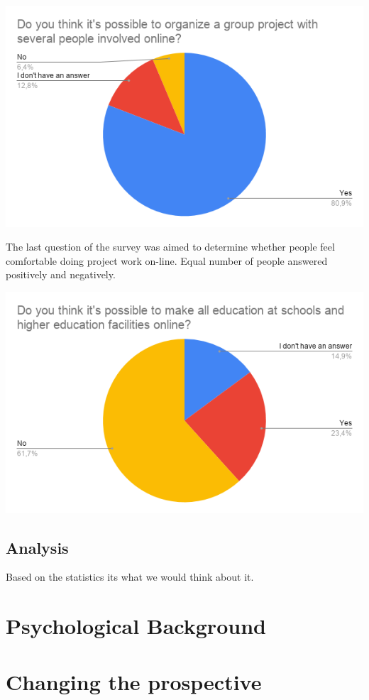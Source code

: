 \documentclass[10pt,twoside,English,a4paper]{article}
\begin{document}
\includegraphics[width=\textwidth]{diagram1.png}

The last question of the survey was aimed to determine whether people feel comfortable doing project work on-line. Equal number of people answered positively and negatively. 

\includegraphics[width=\textwidth]{diagram3.png}


\subsection{Analysis} \label{analysis}

Based on the statistics its what we would think about it.

\section{Psychological Background} \label{back}

\section{Changing the prospective} \label{chan}
\end{document}
